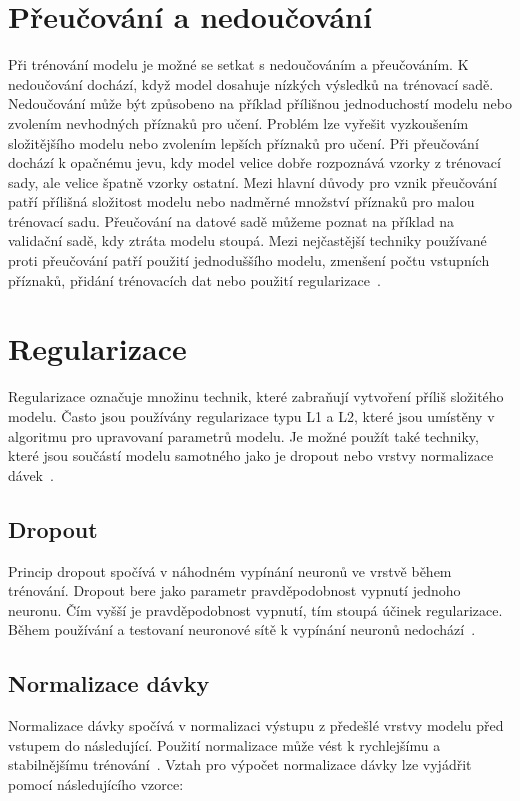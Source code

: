 \documentclass[FM,BP]{tulthesis}
\begin{document}
\section{Přeučování a nedoučování} %
Při trénování modelu je možné se setkat s nedoučováním a přeučováním. K nedoučování dochází, když model dosahuje nízkých výsledků na trénovací sadě. Nedoučování může být způsobeno na příklad přílišnou jednoduchostí modelu nebo zvolením nevhodných příznaků pro učení. Problém lze vyřešit vyzkoušením složitějšího modelu nebo zvolením lepších příznaků pro učení. Při přeučování dochází k opačnému jevu, kdy model velice dobře rozpoznává vzorky z trénovací sady, ale velice špatně vzorky ostatní. Mezi hlavní důvody pro vznik přeučování patří přílišná složitost modelu nebo nadměrné množství příznaků pro malou trénovací sadu. Přeučování na datové sadě můžeme poznat na příklad na validační sadě, kdy ztráta modelu stoupá. Mezi nejčastější techniky používané proti přeučování patří použití jednoduššího modelu, zmenšení počtu vstupních příznaků, přidání trénovacích dat nebo použití regularizace~\cite{burkov2019hundred}.

\section{Regularizace} %
Regularizace označuje množinu technik, které zabraňují vytvoření příliš složitého modelu. Často jsou používány regularizace typu L1 a L2, které jsou umístěny v algoritmu pro upravovaní parametrů modelu. Je možné použít také techniky, které jsou součástí modelu samotného jako je dropout nebo vrstvy normalizace dávek~\cite{burkov2019hundred}.

\subsection{Dropout} %
Princip dropout spočívá v náhodném vypínání neuronů ve vrstvě během trénování. Dropout bere jako parametr pravděpodobnost vypnutí jednoho neuronu. Čím vyšší je pravděpodobnost vypnutí, tím stoupá účinek regularizace. Během používání a testovaní neuronové sítě k vypínání neuronů nedochází~\cite{burkov2019hundred}.

\subsection{Normalizace dávky} %
Normalizace dávky spočívá v normalizaci výstupu z předešlé vrstvy modelu před vstupem do následující. Použití normalizace může vést k rychlejšímu a stabilnějšímu trénování~\cite{burkov2019hundred}. Vztah pro výpočet normalizace dávky lze vyjádřit pomocí následujícího vzorce:
\end{document}
